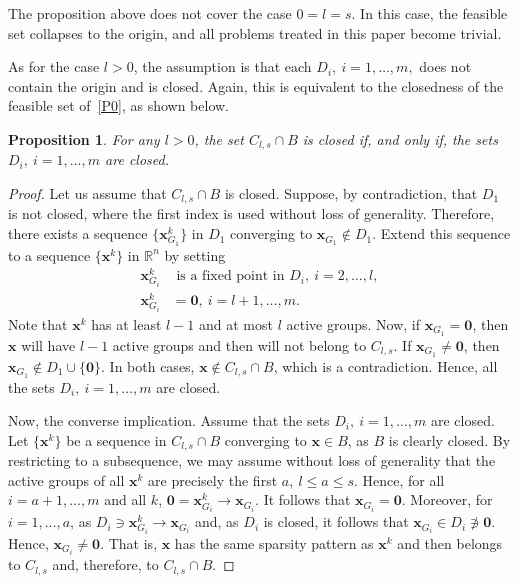 \documentclass[11pt,a4paper]{article}
\theoremstyle{plain}
\newtheorem{proposition}{Proposition}
\theoremstyle{definition}
\theoremstyle{remark}
\newcommand*{\vz}{\mathbf{0}}
\newcommand*\R{\mathbb{R}}
\newcommand*\x{\mathbf{x}}
\begin{document}
The proposition above does not cover the case $0 = l = s$.
In this case, the feasible set collapses to the origin, and all problems treated in this paper become trivial.

As for the case \( l > 0 \), the assumption is that each \( D_i,\ i = 1, \ldots, m, \) does not contain the origin and is closed.
Again, this is equivalent to the closedness of the feasible set of~\eqref{P0}, as shown below.

\begin{proposition}
  For any \( l > 0 \), the set \( C_{l, s} \cap B \) is closed if, and only if, the sets \( D_i,\ i = 1, \ldots, m \) are closed.
\end{proposition}
\begin{proof}
  Let us assume that \( C_{l , s} \cap B \) is closed.
  Suppose, by contradiction, that \( D_1 \) is not closed, where the first index is used without loss of generality.
  Therefore, there exists a sequence \( \{ \x^k_{G_1} \} \) in \( D_1 \) converging to \( \x_{G_1} \not\in D_1 \).
  Extend this sequence to a sequence \( \{ \x^k \} \) in \( \R^n \) by
  setting
  \begin{align*}
    \x_{G_i}^k & \text{ is a fixed point in }
    D_i,\ i = 2, \ldots, l,                   \\ \x_{G_i}^k &= \vz,\ i = l + 1, \ldots, m.
  \end{align*}
  Note that \( \x^k \) has at least \( l-1 \) and at most \( l \) active groups.
  Now, if $\x_{G_1} = \vz$, then \( \x \) will have \( l - 1 \) active groups and then will not belong to \( C_{l, s} \).
  If \( \x_{G_1} \neq \vz \), then \( \x_{G_1} \not\in D_1 \cup \{ \vz \} \).
  In both cases, \( \x \not\in C_{l, s} \cap B \), which is a contradiction.
  Hence, all the sets \( D_i,\ i = 1, \ldots, m \) are closed.

  Now, the converse implication.
  Assume that the sets \( D_i,\ i = 1, \ldots, m \) are closed.
  Let \( \{ \x^k \} \) be a sequence in $C_{l, s} \cap B$ converging to \( \x \in B\), as \( B \) is clearly closed.
  By restricting to a subsequence, we may assume without loss of generality that the active groups of all \( \x^k \) are precisely the first \(a,\ l \leq a \leq s \).
  Hence, for all $i = a + 1, \ldots, m$ and all \( k \), \( \vz = \x^k_{G_i} \rightarrow \x_{G_i} \).
  It follows that \( \x_{G_i} = \vz \).
  Moreover, for $i = 1, \ldots, a$, as \( D_i \ni \x^k_{G_i} \rightarrow \x_{G_i} \) and, as \( D_i \) is closed, it follows that \( \x_{G_i} \in D_i \not\ni \vz \).
  Hence, \( \x_{G_i} \neq \vz \).
  That is, \( \x \) has the same sparsity pattern as \( \x^k \) and then belongs to $C_{l, s}$ and, therefore, to \( C_{l, s} \cap B \).
\end{proof}
\end{document}
